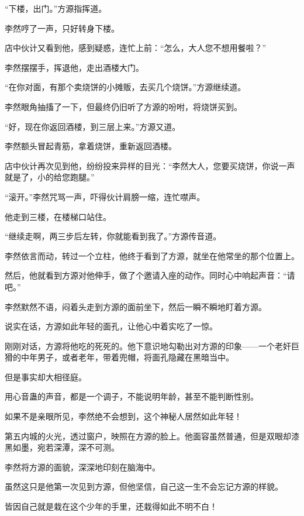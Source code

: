 \begin{this_body}
“下楼，出门。”方源指挥道。

李然哼了一声，只好转身下楼。

店中伙计又看到他，感到疑惑，连忙上前：“怎么，大人您不想用餐啦？”

李然摆摆手，挥退他，走出酒楼大门。

“在你对面，有那个卖烧饼的小摊贩，去买几个烧饼。”方源继续道。

李然眼角抽搐了一下，但最终仍旧听了方源的吩咐，将烧饼买到。

“好，现在你返回酒楼，到三层上来。”方源又道。

李然额头冒起青筋，拿着烧饼，重新返回酒楼。

店中伙计再次见到他，纷纷投来异样的目光：“李然大人，您要买烧饼，你说一声就是了，小的给您跑腿。”

“滚开。”李然咒骂一声，吓得伙计肩膀一缩，连忙噤声。

他走到三楼，在楼梯口站住。

“继续走啊，两三步后左转，你就能看到我了。”方源传音道。

李然依言而动，转过一个立柱，他终于看到了方源，就坐在他常坐的那个位置上。

然后，他就看到方源对他伸手，做了个邀请入座的动作。同时心中响起声音：“请吧。”

李然默然不语，闷着头走到方源的面前坐下，然后一瞬不瞬地盯着方源。

说实在话，方源如此年轻的面孔，让他心中着实吃了一惊。

刚刚对话，方源将他吃的死死的。他下意识地勾勒出对方源的印象——一个老奸巨猾的中年男子，或者老年，带着兜帽，将面孔隐藏在黑暗当中。

但是事实却大相径庭。

用心音蛊的声音，都是一个调子，不能说明年龄，甚至不能判断性别。

如果不是亲眼所见，李然绝不会想到，这个神秘人居然如此年轻！

第五内城的火光，透过窗户，映照在方源的脸上。他面容虽然普通，但是双眼却漆黑如墨，宛若深潭，深不可测。

李然将方源的面貌，深深地印刻在脑海中。

虽然这只是他第一次见到方源，但他坚信，自己这一生不会忘记方源的样貌。

皆因自己就是栽在这个少年的手里，还栽得如此不明不白！

\end{this_body}


